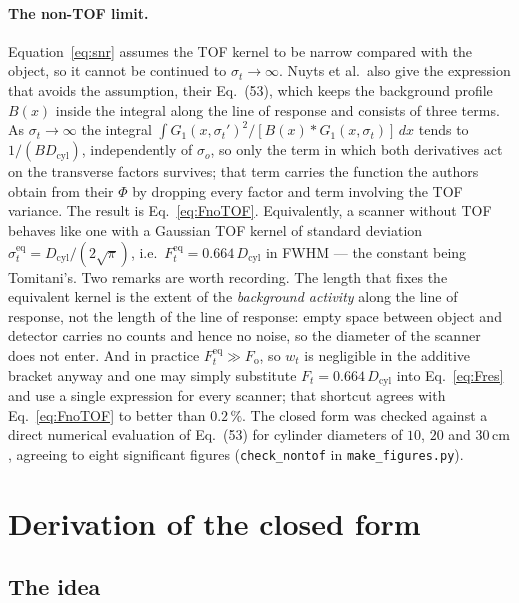 \documentclass[11pt,a4paper]{article}
\newcommand{\Dcyl}{D_{\mathrm{cyl}}}
\newcommand{\Fo}{F_{\mathrm{o}}}
\newcommand{\Ft}{F_{t}}
\newcommand{\so}{\sigma_{\!o}}
\begin{document}
\paragraph{The non-TOF limit.}
Equation~\eqref{eq:snr} assumes the TOF kernel to be narrow compared with the object, so it
cannot be continued to $\sigma_t\to\infty$. Nuyts et al.\ also give the expression that
avoids the assumption, their Eq.~(53), which keeps the background profile $B(x)$ inside the
integral along the line of response and consists of three terms. As $\sigma_t\to\infty$ the
integral $\int G_1(x,\sigma_t')^2/[B(x)*G_1(x,\sigma_t)]\,dx$ tends to $1/(B\Dcyl)$,
independently of $\so$, so only the term in which both derivatives act on the transverse
factors survives; that term carries the function the authors obtain from their $\Phi$ by
dropping every factor and term involving the TOF variance. The result is
Eq.~\eqref{eq:FnoTOF}. Equivalently, a scanner without TOF behaves like one with a Gaussian
TOF kernel of standard deviation $\sigma_t^{\mathrm{eq}}=\Dcyl/(2\sqrt{\pi})$, i.e.\
$\Ft^{\mathrm{eq}}=0.664\,\Dcyl$ in FWHM --- the constant being Tomitani's. Two remarks are
worth recording. The length that fixes the equivalent kernel is the extent of the
\emph{background activity} along the line of response, not the length of the line of
response: empty space between object and detector carries no counts and hence no noise, so
the diameter of the scanner does not enter. And in practice $\Ft^{\mathrm{eq}}\gg\Fo$, so
$w_t$ is negligible in the additive bracket anyway and one may simply substitute
$\Ft=0.664\,\Dcyl$ into Eq.~\eqref{eq:Fres} and use a single expression for every scanner;
that shortcut agrees with Eq.~\eqref{eq:FnoTOF} to better than $0.2\,\%$. The closed form
was checked against a direct numerical evaluation of Eq.~(53) for cylinder diameters of
$10$, $20$ and $30\,\mathrm{cm}$, agreeing to eight significant figures
(\texttt{check\_nontof} in \texttt{make\_figures.py}).


\section{Derivation of the closed form}
\label{sec:derivation}

\subsection{The idea}
\end{document}
